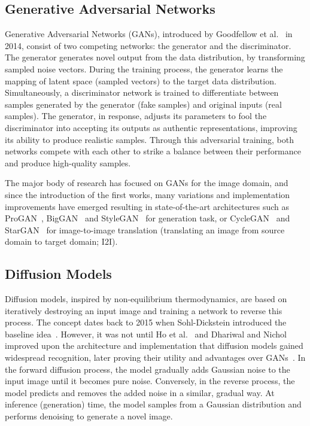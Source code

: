 \documentclass[conference,table]{IEEEtran}
\begin{document}
\subsection{Generative Adversarial Networks}
Generative Adversarial Networks (GANs), introduced by Goodfellow et al.~\cite{goodfellow_generative_2014} in 2014, consist of two competing networks: the generator and the discriminator. 
The generator generates novel output from the data distribution, by transforming sampled noise vectors. During the training process, the generator learns the mapping of latent space (sampled vectors) to the target data distribution.
Simultaneously, a discriminator network is trained to differentiate between samples generated by the generator (fake samples) and original inputs (real samples). 
The generator, in response, adjusts its parameters to fool the discriminator into accepting its outputs as authentic representations, improving its ability to produce realistic samples. 
Through this adversarial training, both networks compete with each other to strike a balance between their performance and produce high-quality samples. 

The major body of research has focused on GANs for the image domain, and since the introduction of the first works, many variations and implementation improvements have emerged resulting in state-of-the-art architectures such as ProGAN~\cite{karras_progressive_2018}, BigGAN~\cite{brock_large_2019} and StyleGAN~\cite{karras_style-based_2019} for generation task, or CycleGAN~\cite{zhu_unpaired_2020} and StarGAN~\cite{choi_stargan_2018} for image-to-image translation (translating an image from source domain to target domain; I2I).

\subsection{Diffusion Models}
Diffusion models, inspired by non-equilibrium thermodynamics, are based on iteratively destroying an input image and training a network to reverse this process. The concept dates back to 2015 when Sohl-Dickstein introduced the baseline idea~\cite{sohl-dickstein_deep_2015}. However, it was not until Ho et al.~\cite{ho_denoising_2020} and Dhariwal and Nichol~\cite{nichol_improved_2021} improved upon the architecture and implementation that diffusion models gained widespread recognition, later proving their utility and advantages over GANs~\cite{dhariwal_diffusion_2021}.
In the forward diffusion process, the model gradually adds Gaussian noise to the input image until it becomes pure noise. Conversely, in the reverse process, the model predicts and removes the added noise in a similar, gradual way. At inference (generation) time, the model samples from a Gaussian distribution and performs denoising to generate a novel image.
\end{document}
